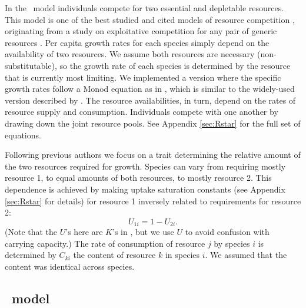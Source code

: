 \documentclass[a4paper,11pt]{article}
\begin{document}
In the \Rstar\ model individuals compete for two essential and
depletable resources. This model is one of the best studied and cited
models of resource competition \citep{Tilman-1977, Tilman-1982,
  Huisman-2001}, originating from a study on exploitative competition
for any pair of generic resources \citep{Leon-1975}. Per capita growth rates for each species simply depend on the availability of two resources.  We assume both
resources are necessary (non-substitutable), so the growth rate
of each species is determined by the resource that is currently most
limiting.  We implemented a version where the specific growth rates
follow a Monod equation as in \citet{Huisman-2001}, which is
similar to the widely-used version described by \citet{Tilman-1977,
  Tilman-1982}.
The resource availabilities, in turn, depend on the rates of resource
supply and consumption. Individuals compete with one another by
drawing down the joint resource pools. See Appendix \ref{sec:Rstar}
for the full set of equations.

Following previous authors \citep{Tilman-1985, Schreiber-2003,
  Fox-2008} we focus on a trait determining the relative amount of the
two resources required for growth. Species can vary from requiring
mostly resource 1, to equal amounts of both resources, to mostly
resource 2. This dependence is achieved by making uptake saturation
constants (see Appendix \ref{sec:Rstar} for details) for resource 1
inversely related to requirements for resource 2:
\begin{equation}
\label{eq:R3}
U_{1i} = 1 - U_{2i}.
\end{equation}
(Note that the $U$'s here are $K$'s in \citet{Huisman-2001}, but we
use $U$ to avoid confusion with carrying capacity.)  The rate of
consumption of resource $j$ by species $i$ is determined by $C_{ki}$
the content of resource $k$ in species $i$. We assumed that the
content was identical across species.

%

\subsection{\plant\ model}
\end{document}
